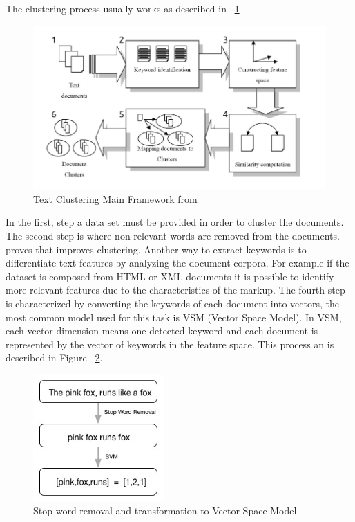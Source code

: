 The clustering process usually works as described in ~\ref{fig:1_Text_Clustering_Main_Framwork}
\begin{figure}
  \begin{center}
    \includegraphics[width=12cm]{images/1_Text_Clustering_Main_Framwork.png}
  \end{center}
  \caption{ Text Clustering Main Framework from ~\citet{Dozono2012} }
  \label{fig:1_Text_Clustering_Main_Framwork}
\end{figure}
In the first, step a data set must be provided in order to cluster the documents. 
The second step is where non relevant words are removed from the documents. ~\citet{Kang2003} proves that improves clustering. Another way to extract keywords is to differentiate text features by analyzing the document corpora. For example if the dataset is composed from HTML or XML documents it is possible to identify more relevant features due to the characteristics of the markup.
The fourth step is characterized by converting the keywords of each document into vectors, the most common model used for this task is VSM (Vector Space Model). In VSM, each vector dimension means one detected keyword and each document is represented by the vector of keywords in the feature space. This process an is described in Figure ~\ref{fig:2_svm}.

\begin{figure}
  \begin{center}
    \includegraphics[width=5cm]{images/2_svm.jpg}
  \end{center}
  \caption{ Stop word removal and transformation to Vector Space Model }
  \label{fig:2_svm}
\end{figure}

